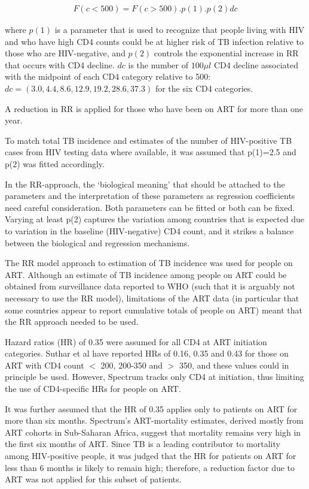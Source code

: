 \begin{align*}
F(c<500) = F(c>500).p(1).p(2)dc
\end{align*}

where $p(1)$ is a parameter that is used to recognize that people living with HIV and who have high CD4 counts could be at higher risk of TB infection relative to those who are HIV-negative, and $p(2)$ controls the exponential increase in RR that occurs with CD4 decline. $dc$ is the  number of $100\mu l$ CD4 decline associated with the midpoint of each CD4 category relative to 500: $dc= (3.0, 4.4, 8.6, 12.9, 19.2, 28.6, 37.3)$ for the six CD4 categories.

A reduction in RR is applied for those who have been on ART for more than one year.

To match total TB incidence and estimates of the number of HIV-positive TB cases from HIV testing data where available, it was assumed that p(1)=2.5 and p(2) was fitted accordingly.  

In the RR-approach, the ‘biological meaning’ that should be attached to the parameters and the interpretation of these parameters as regression coefficients need careful consideration. Both parameters can be fitted or both can be fixed. Varying at least p(2) captures the variation among countries that is expected due to variation in the baseline (HIV-negative) CD4 count, and it strikes a balance between the biological and regression mechanisms.

The RR model approach to estimation of TB incidence was used for people on ART. Although an estimate of TB incidence among people on ART could be obtained from surveillance data reported to WHO (such that it is arguably not necessary to use the RR model), limitations of the ART data (in particular that some countries appear to report cumulative totals of people on ART) meant that the RR approach needed to be used. 

Hazard ratios (HR) of 0.35 were assumed for all CD4 at ART initiation categories. Suthar et al have reported HRs of 0.16, 0.35 and 0.43 for those on ART with CD4 count $<$ 200, 200-350 and $>$ 350,\cite{22911011} and these values could in principle be used. However, Spectrum tracks only CD4 at initiation, thus limiting the use of CD4-specific HRs for people on ART. 

It was further assumed that the HR of 0.35 applies only to patients on ART for more than six months. Spectrum’s ART-mortality estimates, derived mostly from ART cohorts in Sub-Saharan Africa, suggest that mortality remains very high in the first six months of ART. Since TB is a leading contributor to mortality among HIV-positive people, it was judged that the HR for patients on ART for less than 6 months is likely to remain high; therefore, a reduction factor due to ART was not applied for this subset of patients.

